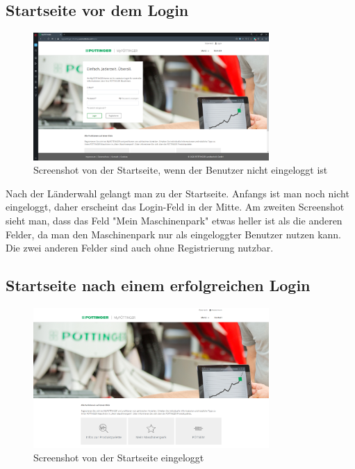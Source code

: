 \subsection{Startseite vor dem Login}
\begin{figure}[H]
	\centerline{
		\includegraphics[width=0.8\textwidth]{./grafiken/erm_home_not_logged_in.png}
	}
	\vskip0pt
	\caption{Screenshot von der Startseite, wenn der Benutzer nicht eingeloggt ist} \label{fig:homeNotLoggedIn}
\end{figure}


Nach der Länderwahl gelangt man zu der Startseite. Anfangs ist man noch nicht eingeloggt, daher erscheint das Login-Feld in der Mitte. Am zweiten Screenshot sieht man, dass das Feld "Mein Maschinenpark" etwas heller ist als die anderen Felder, da man den Maschinenpark nur als eingeloggter Benutzer nutzen kann. Die zwei anderen Felder sind auch ohne Registrierung nutzbar.
 
\subsection{Startseite nach einem erfolgreichen Login}
\begin{figure}[H]
	\centerline{
		\includegraphics[width=0.8\textwidth]{./grafiken/erm_home_logged_in.png}
	}
	\vskip0pt
	\caption{Screenshot von der Startseite eingeloggt} \label{fig:homeLoggedIn}
\end{figure}

